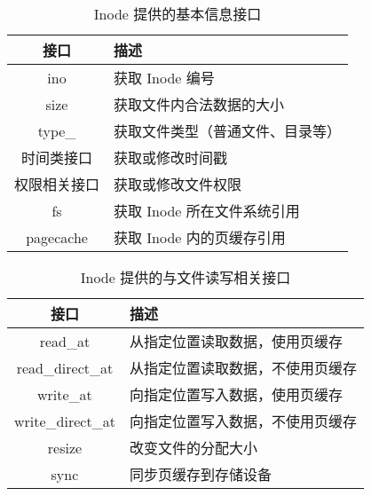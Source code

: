 \begin{table}[h]
    \centering
    \begin{tabularx}{\textwidth}{|c|Y|}
    \hline
    接口 & 描述 \\
    \hline
    ino & 获取 Inode 编号\\
    \hline
    size & 获取文件内合法数据的大小\\
    \hline
    type\_ & 获取文件类型（普通文件、目录等）\\
    \hline
    时间类接口 & 获取或修改时间戳\\
    \hline
    权限相关接口 & 获取或修改文件权限\\
    \hline
    fs & 获取 Inode 所在文件系统引用\\
    \hline
    pagecache & 获取 Inode 内的页缓存引用\\
    \hline
    \end{tabularx}
    \caption{Inode 提供的基本信息接口}
    \label{tab:basic}
\end{table}

\begin{table}[h]
    \centering
    \begin{tabularx}{\textwidth}{|c|Y|}
    \hline
    接口 & 描述 \\
    \hline
    read\_at & 从指定位置读取数据，使用页缓存\\
    \hline
    read\_direct\_at & 从指定位置读取数据，不使用页缓存\\
    \hline
    write\_at & 向指定位置写入数据，使用页缓存\\
    \hline
    write\_direct\_at & 向指定位置写入数据，不使用页缓存\\
    \hline
    resize & 改变文件的分配大小\\
    \hline
    sync & 同步页缓存到存储设备\\
    \hline
    \end{tabularx}
    \caption{Inode 提供的与文件读写相关接口}
    \label{tab:io}
\end{table}

